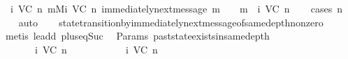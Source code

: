 \begin{isabellebody}
\ \ {\isachardoublequoteopen}{\isasymforall}{\isasymsigma}{\isasymin}{\isasymSigma}{\isacharunderscore}i\ {\isacharparenleft}V{\isacharcomma}C{\isacharcomma}{\isasymepsilon}{\isacharparenright}\ n{\isachardot}\ {\isasymforall}m{\isasymin}M{\isacharunderscore}i\ {\isacharparenleft}V{\isacharcomma}C{\isacharcomma}{\isasymepsilon}{\isacharparenright}\ n{\isachardot}\ immediately{\isacharunderscore}next{\isacharunderscore}message\ {\isacharparenleft}{\isasymsigma}{\isacharcomma}m{\isacharparenright}\ {\isasymlongrightarrow}\ {\isasymsigma}\ {\isasymunion}\ {\isacharbraceleft}m{\isacharbraceright}\ {\isasymin}\ {\isasymSigma}{\isacharunderscore}i\ {\isacharparenleft}V{\isacharcomma}C{\isacharcomma}{\isasymepsilon}{\isacharparenright}\ {\isacharparenleft}n{\isacharplus}{}{\isacharparenright}{\isachardoublequoteclose}\isanewline
%
\isadelimproof
\ \ %
\endisadelimproof
%
\isatagproof
{}\isamarkupfalse%
\ {\isacharparenleft}cases\ n{\isacharparenright}\isanewline
\ \ \isamarkupfalse%
\ auto{\isacharbrackleft}{}{\isacharbrackright}\isanewline
\ \ \isamarkupfalse%
\ state{\isacharunderscore}transition{\isacharunderscore}by{\isacharunderscore}immediately{\isacharunderscore}next{\isacharunderscore}message{\isacharunderscore}of{\isacharunderscore}same{\isacharunderscore}depth{\isacharunderscore}non{\isacharunderscore}zero\isanewline
\ \ \isamarkupfalse%
\ {\isacharparenleft}metis\ le{\isacharunderscore}add{}\ plus{\isacharunderscore}{}{\isacharunderscore}eq{\isacharunderscore}Suc{\isacharparenright}%
\endisatagproof
{\isafoldproof}%
%
\isadelimproof
\isanewline
%
\endisadelimproof
\isanewline
{}\isamarkupfalse%
\ {\isacharparenleft}\ Params{\isacharparenright}\ past{\isacharunderscore}state{\isacharunderscore}exists{\isacharunderscore}in{\isacharunderscore}same{\isacharunderscore}depth\ {\isacharcolon}\isanewline
\ \ {\isachardoublequoteopen}{\isasymforall}\ {\isasymsigma}\ {\isasymsigma}{\isacharprime}{\isachardot}\ {\isasymsigma}{\isacharprime}\ {\isasymin}\ {\isasymSigma}{\isacharunderscore}i\ {\isacharparenleft}V{\isacharcomma}C{\isacharcomma}{\isasymepsilon}{\isacharparenright}\ n\ {\isasymlongrightarrow}\ {\isasymsigma}\ {\isasymsubseteq}\ {\isasymsigma}{\isacharprime}\ {\isasymlongrightarrow}\ {\isasymsigma}\ {\isasymin}\ {\isasymSigma}\ {\isasymlongrightarrow}\ {\isasymsigma}\ {\isasymin}\ {\isasymSigma}{\isacharunderscore}i\ {\isacharparenleft}V{\isacharcomma}C{\isacharcomma}{\isasymepsilon}{\isacharparenright}\ n{\isachardoublequoteclose}\isanewline

\end{isabellebody}
